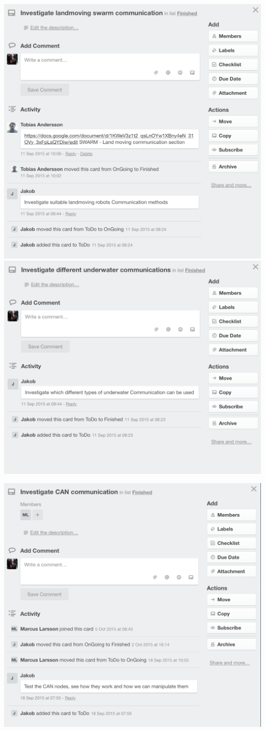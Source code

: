     \includegraphics[scale=0.5]{Screenshoot2}
    \includegraphics[scale=0.5]{Screenshoot3}

    \includegraphics[scale=0.5]{Screenshoot4}
